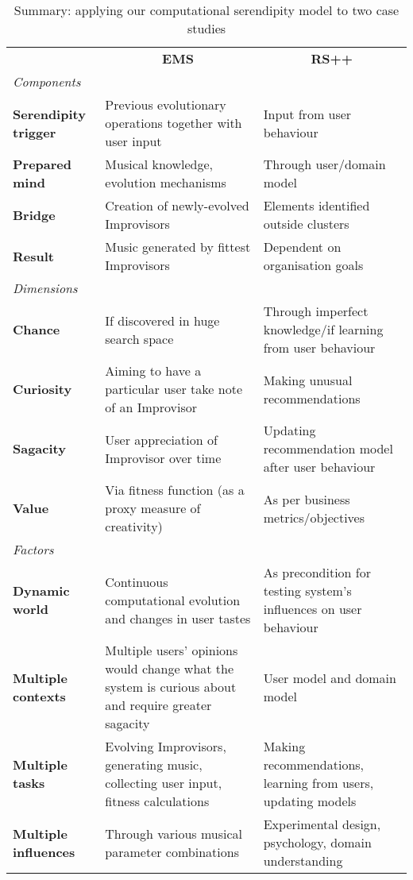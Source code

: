\afterpage{\clearpage}
\begin{table}[p]
{\centering \renewcommand{\arraystretch}{1.5}
\footnotesize
\begin{tabular}{p{.7in}@{\hspace{.1in}}p{1.9in}@{\hspace{.1in}}p{1.9in}}
\multicolumn{1}{c}{} & \multicolumn{1}{c}{\textbf{EMS}} & \multicolumn{1}{c}{\textbf{RS++}} \\[-.1in]
\multicolumn{1}{l}{\em Components} & \multicolumn{1}{c}{} & \multicolumn{1}{c}{} \\
\cline{2-3}
\textbf{Serendipity trigger} & Previous evolutionary operations together with user input & Input from user behaviour \\
\textbf{Prepared mind} & Musical knowledge, evolution mechanisms & Through user/domain model \\
\textbf{Bridge}  & Creation of newly-evolved Improvisors & Elements identified outside clusters \\
\textbf{Result} & Music generated by fittest Improvisors& Dependent on organisation goals \\ \cline{2-3}
\multicolumn{1}{l}{\em Dimensions} & \multicolumn{1}{c}{} & \multicolumn{1}{c}{} \\
\cline{2-3}
\textbf{Chance} & If discovered in huge search space & Through imperfect knowledge/if learning from user behaviour \\
\textbf{Curiosity} & Aiming to have a particular user take note of an Improvisor & Making unusual recommendations \\
\textbf{Sagacity} & User appreciation of Improvisor over time & Updating recommendation model after user behaviour \\
\textbf{Value} & Via fitness function (as a proxy measure of creativity) & As per business metrics/objectives \\
\cline{2-3}
\multicolumn{1}{l}{\em Factors} & \multicolumn{1}{c}{} & \multicolumn{1}{c}{} \\
\cline{2-3}
\textbf{Dynamic world}  & Continuous computational evolution and changes in user tastes& As precondition for testing system's influences on user behaviour\\
\textbf{Multiple contexts} & Multiple users' opinions would change what the system is curious about and require greater sagacity & User model and domain model\\
\textbf{Multiple tasks} & Evolving Improvisors, generating music, collecting user input, fitness calculations & Making recommendations, learning from users, updating models \\
\textbf{Multiple influences} & Through various musical parameter combinations& Experimental design, psychology, domain understanding\\
\cline{2-3}
\end{tabular}
\par}
\normalsize
\bigskip

\caption{Summary: applying our computational serendipity model to two case studies\label{caseStudies}}
\end{table}%

